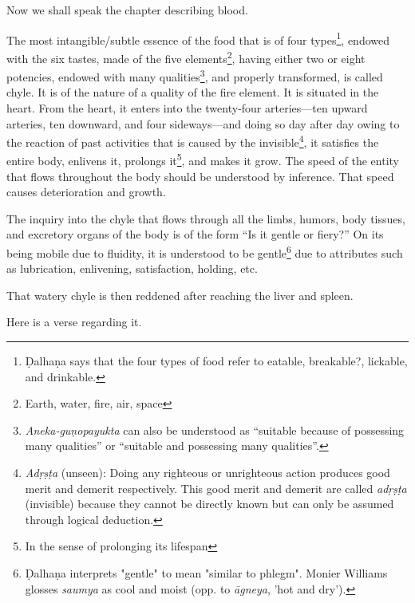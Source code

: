 \begin{translation}    
\item [1] Now we shall speak the chapter describing blood.

\item [2]

    
\item [3]    
    The most intangible/subtle essence of the food that is of four types\footnote{Ḍalhaṇa says that the four types of food refer to eatable, breakable?, lickable, and drinkable.}, endowed with the six tastes, made of the five elements\footnote{Earth, water, fire, air, space}, having either two or eight potencies, endowed with many qualities\footnote{\emph{Aneka-guṇopayukta} can also be understood as “suitable because of possessing many qualities” or “suitable and possessing many qualities”.}, and properly transformed, is called chyle. It is of the nature of a quality of the fire element. It is situated in the heart. From the heart, it enters into the twenty-four arteries—ten upward arteries, ten downward, and four sideways—and doing so day after day owing to the reaction of past activities that is caused by the invisible\footnote{\emph{Adṛṣṭa} (unseen): Doing any righteous or unrighteous action produces good merit and demerit respectively. This good merit and demerit are called \emph{adṛṣṭa} (invisible) because they cannot be directly known but can only be assumed through logical deduction.}, it satisfies the entire body, enlivens it, prolongs it\footnote{In the sense of prolonging its lifespan}, and makes it grow. The speed of the entity that flows throughout the body should be understood by inference. That speed causes deterioration and growth. 
    
    The inquiry into the chyle that flows through all the limbs, humors, body tissues, and excretory organs of the body is of the form “Is it gentle or fiery?” On its being mobile due to fluidity, it is understood to be gentle\footnote{Ḍalhaṇa interprets "gentle" to mean "similar to phlegm". Monier Williams glosses \emph{saumya} as cool and moist (opp. to \emph{āgneya}, 'hot and dry').} due to attributes such as lubrication, enlivening, satisfaction, holding, etc. 
    
\item [4]  
That watery chyle is then reddened after reaching the liver and spleen.

\item [5]
Here is a verse regarding it.


\end{translation}
